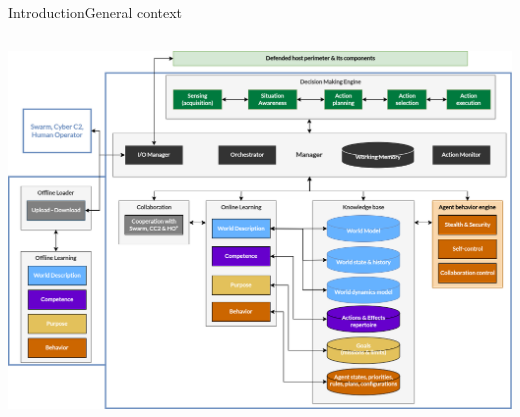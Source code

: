 \begin{frame}{Introduction}{General context}
\begin{columns}
        \hspace{-2ex}
        \begin{column}{0.6\textwidth}
            \includegraphics[width=\linewidth]{figures/mascara.png}
        \end{column}

    \end{columns}

\end{frame}

